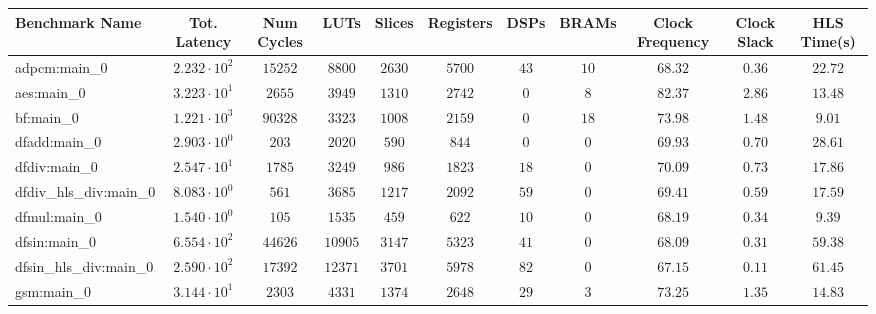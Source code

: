 \begin{tabular}{|l|c|c|c|c|c|c|c|c|c|c|}
\hline
Benchmark Name          & Tot. Latency           & Num Cycles & LUTs      & Slices    & Registers & DSPs    & BRAMs   & Clock Frequency & Clock Slack & HLS Time(s) \\
\hline
adpcm:main\_0           & $ 2.232 \cdot 10^{2} $ & $ 15252  $ & $ 8800  $ & $ 2630  $ & $ 5700  $ & $ 43  $ & $ 10  $ & $ 68.32       $ & $ 0.36    $ & $ 22.72   $ \\
aes:main\_0             & $ 3.223 \cdot 10^{1} $ & $ 2655   $ & $ 3949  $ & $ 1310  $ & $ 2742  $ & $ 0   $ & $ 8   $ & $ 82.37       $ & $ 2.86    $ & $ 13.48   $ \\
bf:main\_0              & $ 1.221 \cdot 10^{3} $ & $ 90328  $ & $ 3323  $ & $ 1008  $ & $ 2159  $ & $ 0   $ & $ 18  $ & $ 73.98       $ & $ 1.48    $ & $ 9.01    $ \\
dfadd:main\_0           & $ 2.903 \cdot 10^{0} $ & $ 203    $ & $ 2020  $ & $ 590   $ & $ 844   $ & $ 0   $ & $ 0   $ & $ 69.93       $ & $ 0.70    $ & $ 28.61   $ \\
dfdiv:main\_0           & $ 2.547 \cdot 10^{1} $ & $ 1785   $ & $ 3249  $ & $ 986   $ & $ 1823  $ & $ 18  $ & $ 0   $ & $ 70.09       $ & $ 0.73    $ & $ 17.86   $ \\
dfdiv\_hls\_div:main\_0 & $ 8.083 \cdot 10^{0} $ & $ 561    $ & $ 3685  $ & $ 1217  $ & $ 2092  $ & $ 59  $ & $ 0   $ & $ 69.41       $ & $ 0.59    $ & $ 17.59   $ \\
dfmul:main\_0           & $ 1.540 \cdot 10^{0} $ & $ 105    $ & $ 1535  $ & $ 459   $ & $ 622   $ & $ 10  $ & $ 0   $ & $ 68.19       $ & $ 0.34    $ & $ 9.39    $ \\
dfsin:main\_0           & $ 6.554 \cdot 10^{2} $ & $ 44626  $ & $ 10905 $ & $ 3147  $ & $ 5323  $ & $ 41  $ & $ 0   $ & $ 68.09       $ & $ 0.31    $ & $ 59.38   $ \\
dfsin\_hls\_div:main\_0 & $ 2.590 \cdot 10^{2} $ & $ 17392  $ & $ 12371 $ & $ 3701  $ & $ 5978  $ & $ 82  $ & $ 0   $ & $ 67.15       $ & $ 0.11    $ & $ 61.45   $ \\
gsm:main\_0             & $ 3.144 \cdot 10^{1} $ & $ 2303   $ & $ 4331  $ & $ 1374  $ & $ 2648  $ & $ 29  $ & $ 3   $ & $ 73.25       $ & $ 1.35    $ & $ 14.83   $ \\

\end{tabular}
